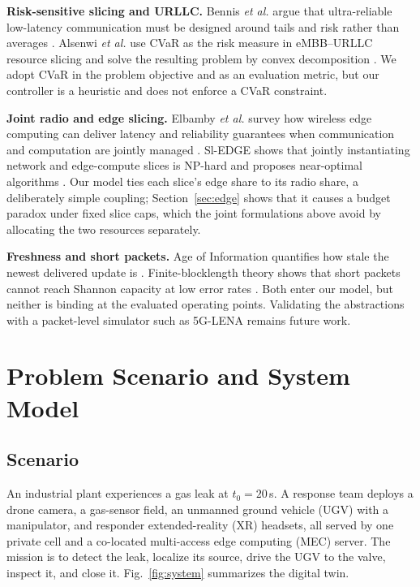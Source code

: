 \documentclass[conference]{IEEEtran}
\newcommand{\figref}[1]{Fig.~\ref{#1}}
\begin{document}
\textbf{Risk-sensitive slicing and URLLC.} Bennis \emph{et al.} argue that ultra-reliable low-latency communication must be designed around tails and risk rather than averages \cite{bennis}. Alsenwi \emph{et al.} use CVaR as the risk measure in eMBB--URLLC resource slicing and solve the resulting problem by convex decomposition \cite{alsenwi}. We adopt CVaR \cite{cvar} in the problem objective and as an evaluation metric, but our controller is a heuristic and does not enforce a CVaR constraint.

\textbf{Joint radio and edge slicing.} Elbamby \emph{et al.} survey how wireless edge computing can deliver latency and reliability guarantees when communication and computation are jointly managed \cite{elbamby}. Sl-EDGE shows that jointly instantiating network and edge-compute slices is NP-hard and proposes near-optimal algorithms \cite{sledge}. Our model ties each slice's edge share to its radio share, a deliberately simple coupling; Section~\ref{sec:edge} shows that it causes a budget paradox under fixed slice caps, which the joint formulations above avoid by allocating the two resources separately.

\textbf{Freshness and short packets.} Age of Information quantifies how stale the newest delivered update is \cite{kaul,aoi}. Finite-blocklength theory shows that short packets cannot reach Shannon capacity at low error rates \cite{polyanskiy}. Both enter our model, but neither is binding at the evaluated operating points. Validating the abstractions with a packet-level simulator such as 5G-LENA \cite{lena} remains future work.

\section{Problem Scenario and System Model}\label{sec:model}
\subsection{Scenario}
An industrial plant experiences a gas leak at $t_0=20$\,s. A response team deploys a drone camera, a gas-sensor field, an unmanned ground vehicle (UGV) with a manipulator, and responder extended-reality (XR) headsets, all served by one private cell and a co-located multi-access edge computing (MEC) server. The mission is to detect the leak, localize its source, drive the UGV to the valve, inspect it, and close it. \figref{fig:system} summarizes the digital twin.
\end{document}
